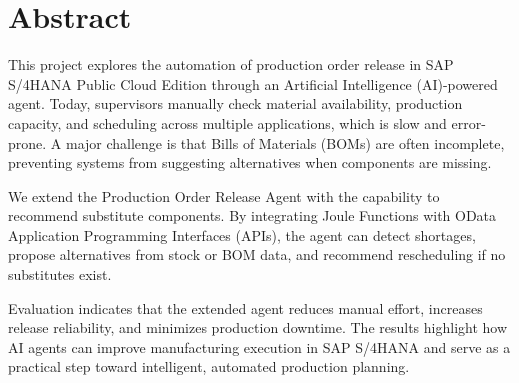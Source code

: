 \chapter*{Abstract}

This project explores the automation of production order release in SAP S/4HANA Public Cloud Edition through an Artificial Intelligence (AI)-powered agent. Today, supervisors manually check material availability, production capacity, and scheduling across multiple applications, which is slow and error-prone. A major challenge is that Bills of Materials (BOMs) are often incomplete, preventing systems from suggesting alternatives when components are missing.  

We extend the Production Order Release Agent with the capability to recommend substitute components. By integrating Joule Functions with OData Application Programming Interfaces (APIs), the agent can detect shortages, propose alternatives from stock or BOM data, and recommend rescheduling if no substitutes exist.  

Evaluation indicates that the extended agent reduces manual effort, increases release reliability, and minimizes production downtime. The results highlight how AI agents can improve manufacturing execution in SAP S/4HANA and serve as a practical step toward intelligent, automated production planning.  



\newpage
\printnomenclature
\newpage